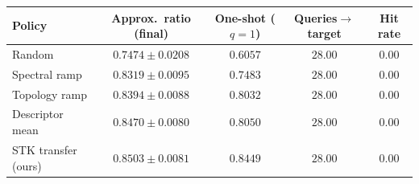 \begin{tabular}{lcccc}
\toprule
Policy & Approx.\ ratio (final) & One-shot ($q{=}1$) & Queries$\to$target & Hit rate \\
\midrule
Random & $0.7474\pm0.0208$ & $0.6057$ & $28.00$ & $0.00$ \\
Spectral ramp & $0.8319\pm0.0095$ & $0.7483$ & $28.00$ & $0.00$ \\
Topology ramp & $0.8394\pm0.0088$ & $0.8032$ & $28.00$ & $0.00$ \\
Descriptor mean & $0.8470\pm0.0080$ & $0.8050$ & $28.00$ & $0.00$ \\
STK transfer (ours) & $\mathbf{0.8503}\pm0.0081$ & $0.8449$ & $28.00$ & $0.00$ \\
\bottomrule
\end{tabular}
